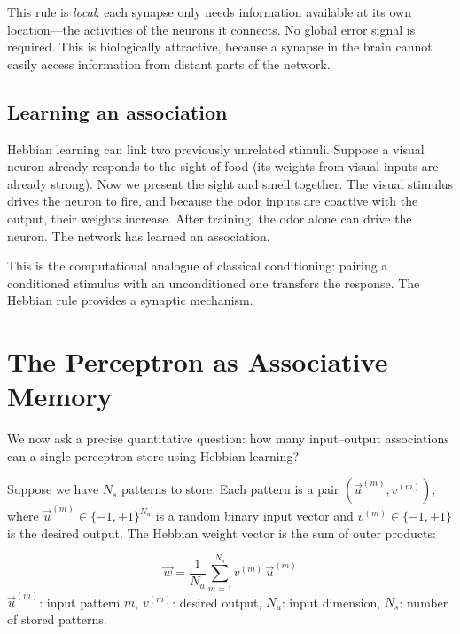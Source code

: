 This rule is \emph{local}: each synapse only needs information available at its own location---the activities of the neurons it connects. No global error signal is required. This is biologically attractive, because a synapse in the brain cannot easily access information from distant parts of the network.

\subsection{Learning an association}

Hebbian learning can link two previously unrelated stimuli. Suppose a visual neuron already responds to the sight of food (its weights from visual inputs are already strong). Now we present the sight and smell together. The visual stimulus drives the neuron to fire, and because the odor inputs are coactive with the output, their weights increase. After training, the odor alone can drive the neuron. The network has learned an association.

This is the computational analogue of classical conditioning: pairing a conditioned stimulus with an unconditioned one transfers the response. The Hebbian rule provides a synaptic mechanism.

\section{The Perceptron as Associative Memory}
\label{sec:perceptron-memory}

We now ask a precise quantitative question: how many input--output associations can a single perceptron store using Hebbian learning?

Suppose we have $N_s$ patterns to store. Each pattern is a pair $(\vec{u}^{(m)}, v^{(m)})$, where $\vec{u}^{(m)} \in \{-1, +1\}^{N_u}$ is a random binary input vector and $v^{(m)} \in \{-1, +1\}$ is the desired output. The Hebbian weight vector is the sum of outer products:

\begin{keyequation}
\begin{equation}
  \vec{w} = \frac{1}{N_u}\sum_{m=1}^{N_s} v^{(m)}\,\vec{u}^{(m)}
  \label{eq:hebb-weight}
\end{equation}
\tcblower
$\vec{u}^{(m)}$: input pattern $m$, \quad
$v^{(m)}$: desired output, \quad
$N_u$: input dimension, \quad
$N_s$: number of stored patterns.
\end{keyequation}

